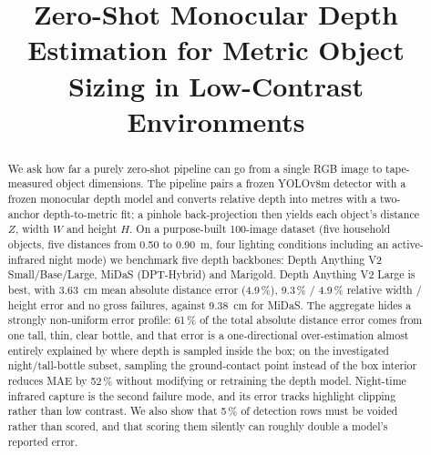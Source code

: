 \documentclass[conference]{IEEEtran}
\begin{document}
\title{Zero-Shot Monocular Depth Estimation for Metric Object Sizing in
Low-Contrast Environments}


\author{
\and
{}
}

\maketitle

\begin{abstract}
We ask how far a purely zero-shot pipeline can go from a single RGB image to
tape-measured object dimensions. The pipeline pairs a frozen YOLOv8m detector
with a frozen monocular depth model and converts relative depth into metres with
a two-anchor depth-to-metric fit; a pinhole back-projection then yields each object's
distance $Z$, width $W$ and height $H$. On a purpose-built 100-image dataset
(five household objects, five distances from 0.50 to 0.90~m, four lighting
conditions including an active-infrared night mode) we benchmark five depth
backbones: Depth Anything V2 Small/Base/Large, MiDaS (DPT-Hybrid) and Marigold.
Depth Anything V2 Large is best, with 3.63~cm mean absolute distance error
(4.9\,\%), 9.3\,\% / 4.9\,\% relative width / height error and no gross failures,
against 9.38~cm for MiDaS. The aggregate hides a strongly non-uniform error
profile: 61\,\% of the total absolute distance error comes from one tall, thin,
clear bottle, and that error is a one-directional over-estimation almost
entirely explained by where depth is sampled inside the box; on the investigated
night/tall-bottle subset, sampling the ground-contact point instead of the box
interior reduces MAE by 52\,\% without modifying or retraining the depth model.
Night-time infrared capture is the second failure mode, and its error tracks
highlight clipping rather than low contrast. We also show that 5\,\% of
detection rows must be voided rather than scored, and that scoring them silently
can roughly double a model's reported error.
\end{abstract}
\end{document}
